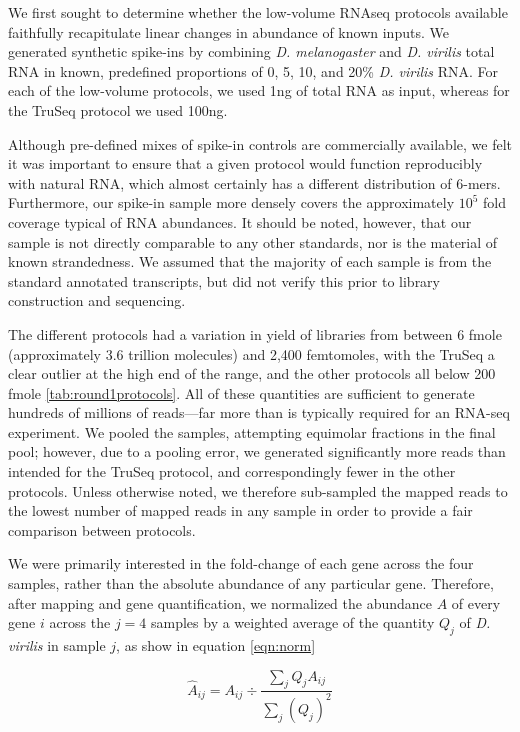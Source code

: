 We first sought to determine whether the low-volume RNAseq protocols available faithfully recapitulate linear changes in abundance of known inputs. We generated synthetic spike-ins by combining {\em D. melanogaster} and {\em D. virilis} total RNA in known, predefined proportions of 0, 5, 10, and 20\% {\em D. virilis} RNA. For each of the low-volume protocols, we used 1ng of total RNA as input, whereas for the TruSeq protocol we used 100ng.

Although pre-defined mixes of spike-in controls are commercially available, we felt it was important to ensure that a given protocol would function reproducibly with natural RNA, which almost certainly has a different distribution of 6-mers. Furthermore, our spike-in sample more densely covers the approximately $10^5$ fold coverage typical of RNA abundances.  It should be noted, however, that our sample is not directly comparable to any other standards, nor is the material of known strandedness.  We assumed that the majority of each sample is from the standard annotated transcripts, but did not verify this prior to library construction and sequencing.

The different protocols had a variation in yield of libraries from between 6 fmole (approximately 3.6 trillion molecules) and 2,400 femtomoles, with the TruSeq a clear outlier at the high end of the range, and the other protocols all below 200 fmole \ref{tab:round1protocols}.  All of these quantities are sufficient to generate hundreds of millions of reads---far more than is typically required for an RNA-seq experiment. We pooled the samples, attempting equimolar fractions in the final pool; however, due to a pooling error, we generated significantly more reads than intended for the TruSeq protocol, and correspondingly fewer in the other protocols. Unless otherwise noted, we therefore sub-sampled the mapped reads to the lowest number of mapped reads in any sample in order to provide a fair comparison between protocols. 

We were primarily interested in the fold-change of each gene across the four samples, rather than the absolute abundance of any particular gene. Therefore, after mapping and gene quantification, we normalized the abundance $A$ of every gene $i$ across the $j=4$ samples by a weighted average of the quantity $Q_j$ of {\em D. virilis} in sample $j$, as show in equation \ref{eqn:norm}

\begin{equation}
\hat{A}_{ij} = A_{ij} \div \frac{\sum_j Q_j A_{ij}}{\sum_j (Q_j)^2}  
\end{equation}


